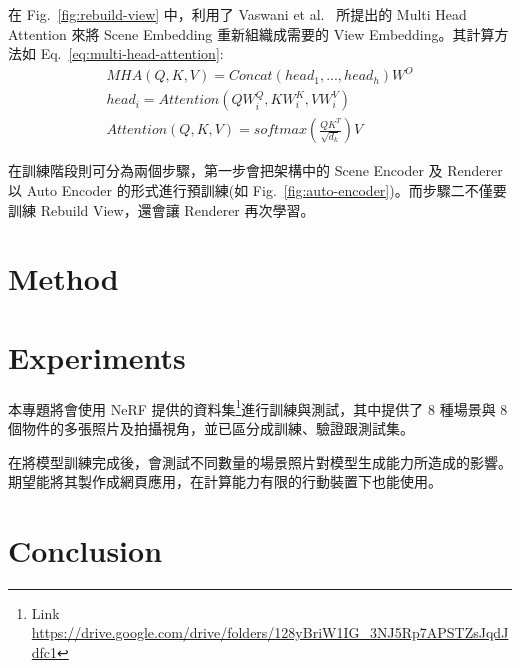 \documentclass[10pt,twocolumn,letterpaper]{article}
\begin{document}
\begin{CJK}{UTF8}{bkai}
   在 Fig.~\ref{fig:rebuild-view} 中，利用了 Vaswani et al.~\cite{AttentionIsAllYouNeed} 所提出的
   Multi Head Attention 來將 Scene Embedding 重新組織成需要的 View Embedding。其計算方法如 Eq.~\ref{eq:multi-head-attention}:
   \begin{equation}
      \begin{aligned}
         MHA(Q, K, V) = Concat(head_{1},...,head_{h})W^{O}      \\
         head_{i} = Attention(QW^{Q}_{i},KW^{K}_{i},VW^{V}_{i}) \\
         Attention(Q, K, V ) = softmax(\frac{QK^{T}}{\sqrt{d_{k}}})V
      \end{aligned}
      \label{eq:multi-head-attention}
   \end{equation}

   在訓練階段則可分為兩個步驟，第一步會把架構中的 Scene Encoder 及 Renderer 以 Auto Encoder 的形式進行預訓練(如
   Fig.~\ref{fig:auto-encoder})。而步驟二不僅要訓練 Rebuild View，還會讓 Renderer 再次學習。

   \section{Method}
   \section{Experiments}
   本專題將會使用 NeRF 提供的資料集\footnote{Link \href{https://drive.google.com/drive/folders/128yBriW1IG_3NJ5Rp7APSTZsJqdJdfc1}{https://drive.google.com/drive/folders/128yBriW1IG\_3NJ5Rp7APSTZsJqdJdfc1}}進行訓練與測試，其中提供了
   8 種場景與 8 個物件的多張照片及拍攝視角，並已區分成訓練、驗證跟測試集。

   在將模型訓練完成後，會測試不同數量的場景照片對模型生成能力所造成的影響。期望能將其製作成網頁應用，在計算能力有限的行動裝置下也能使用。

   \section{Conclusion}


    {\small
     
     
    }
\end{CJK}
\end{document}
